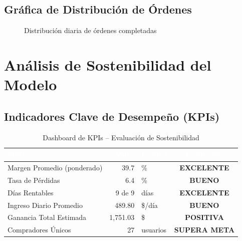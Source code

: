 \documentclass[12pt, a4paper]{article}
\begin{document}
\subsection{Gráfica de Distribución de Órdenes}

\begin{figure}[H]
\centering
{}
\caption{Distribución diaria de órdenes completadas}
\end{figure}

\section{Análisis de Sostenibilidad del Modelo}

\subsection{Indicadores Clave de Desempeño (KPIs)}

\begin{table}[H]
\centering
\caption{Dashboard de KPIs -- Evaluación de Sostenibilidad}
\begin{tabular}{l r l c}
\toprule
\rowcolor{tableheader}
\textcolor{white}{\textbf{Métrica}} & \textcolor{white}{\textbf{Valor}} & \textcolor{white}{\textbf{Unidad}} & \textcolor{white}{\textbf{Evaluación}} \\
\midrule
Margen Promedio (ponderado) & 39.7 & \% & \textcolor{successgreen}{\textbf{EXCELENTE}} \\
\rowcolor{rowalt}
Tasa de Pérdidas & 6.4 & \% & \textcolor{accentgreen}{\textbf{BUENO}} \\
Días Rentables & 9 de 9 & días & \textcolor{successgreen}{\textbf{EXCELENTE}} \\
\rowcolor{rowalt}
Ingreso Diario Promedio & 489.80 & \$/día & \textcolor{successgreen}{\textbf{BUENO}} \\
Ganancia Total Estimada & 1,751.03 & \$ & \textcolor{successgreen}{\textbf{POSITIVA}} \\
\rowcolor{rowalt}
Compradores Únicos & 27 & usuarios & \textcolor{successgreen}{\textbf{SUPERA META}} \\
\bottomrule
\end{tabular}
\end{table}
\end{document}
